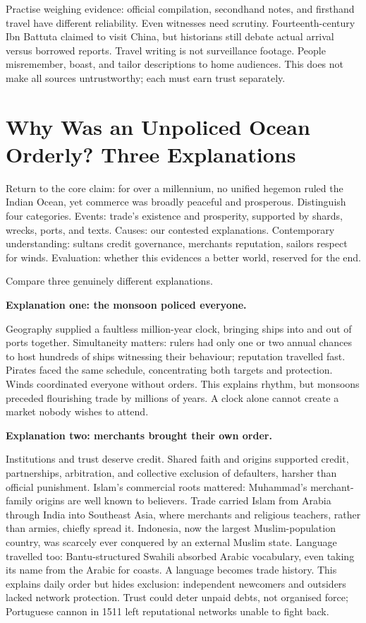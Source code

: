 Practise weighing evidence: official compilation, secondhand notes, and firsthand travel have different reliability. Even witnesses need scrutiny. Fourteenth-century Ibn Battuta claimed to visit China, but historians still debate actual arrival versus borrowed reports. Travel writing is not surveillance footage. People misremember, boast, and tailor descriptions to home audiences. This does not make all sources untrustworthy; each must earn trust separately.

\section[Order without Ocean Police]{Why Was an Unpoliced Ocean Orderly? Three Explanations}
Return to the core claim: for over a millennium, no unified hegemon ruled the Indian Ocean, yet commerce was broadly peaceful and prosperous. Distinguish four categories. Events: trade's existence and prosperity, supported by shards, wrecks, ports, and texts. Causes: our contested explanations. Contemporary understanding: sultans credit governance, merchants reputation, sailors respect for winds. Evaluation: whether this evidences a better world, reserved for the end.

Compare three genuinely different explanations.

\textbf{Explanation one: the monsoon policed everyone.}

Geography supplied a faultless million-year clock, bringing ships into and out of ports together. Simultaneity matters: rulers had only one or two annual chances to host hundreds of ships witnessing their behaviour; reputation travelled fast. Pirates faced the same schedule, concentrating both targets and protection. Winds coordinated everyone without orders. This explains rhythm, but monsoons preceded flourishing trade by millions of years. A clock alone cannot create a market nobody wishes to attend.

\textbf{Explanation two: merchants brought their own order.}

Institutions and trust deserve credit. Shared faith and origins supported credit, partnerships, arbitration, and collective exclusion of defaulters, harsher than official punishment. Islam's commercial roots mattered: Muhammad's merchant-family origins are well known to believers. Trade carried Islam from Arabia through India into Southeast Asia, where merchants and religious teachers, rather than armies, chiefly spread it. Indonesia, now the largest Muslim-population country, was scarcely ever conquered by an external Muslim state. Language travelled too: Bantu-structured Swahili absorbed Arabic vocabulary, even taking its name from the Arabic for coasts. A language becomes trade history. This explains daily order but hides exclusion: independent newcomers and outsiders lacked network protection. Trust could deter unpaid debts, not organised force; Portuguese cannon in 1511 left reputational networks unable to fight back.

